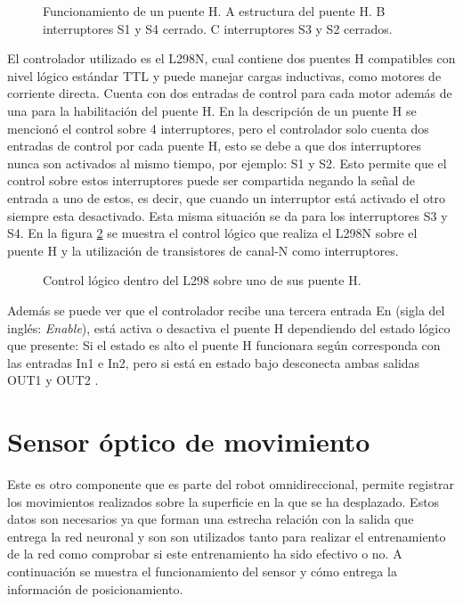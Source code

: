 \documentclass{iccmemoria}
\begin{document}
\begin{figure}[H]
  \centering
  
  \caption[Funcionamiento de un puente H.]{Funcionamiento de un puente H. A estructura del puente H. B interruptores S1 y S4 cerrado. C interruptores S3 y S2 cerrados.}
  \label{fig:H bridge}
\end{figure}

El controlador utilizado es el L298N, cual contiene dos puentes H compatibles con nivel lógico estándar TTL y puede manejar cargas inductivas, como motores de corriente directa. Cuenta con dos entradas de control para cada motor además de una para la habilitación del puente H. En la descripción de un puente H se mencionó el control sobre 4 interruptores, pero el controlador solo cuenta dos entradas de control por cada puente H, esto se debe a que dos interruptores nunca son activados al mismo tiempo, por ejemplo: S1 y S2. Esto permite que el control sobre estos interruptores puede ser compartida negando la señal de entrada a uno de estos, es decir, que cuando un interruptor está activado el otro siempre esta desactivado. Esta misma situación se da para los interruptores S3 y S4. En la figura \ref{fig:H bridge circuit} se muestra el control lógico que realiza el L298N sobre el puente H y la utilización de transistores de canal-N  como interruptores.\\

\begin{figure}[H]
  \centering
  \selectfont{
  
  }
  \caption[Control lógico del controlador L298]{Control lógico dentro del L298 sobre uno de sus puente H.}
  \label{fig:H bridge circuit}
\end{figure}

Además se puede ver que el controlador recibe una tercera entrada En (sigla del inglés: \emph{Enable}), está activa o desactiva el puente H dependiendo del estado lógico que presente: Si el estado es alto el puente H funcionara según corresponda con las entradas In1 e In2, pero si está en estado bajo desconecta ambas salidas OUT1 y OUT2 \cite{st:l298}.

\section{Sensor óptico de movimiento}

Este es otro componente que es parte del robot omnidireccional, permite registrar los movimientos realizados sobre la superficie en la que se ha desplazado. Estos datos son necesarios ya que forman una estrecha relación con la salida que entrega la red neuronal y son son utilizados tanto para realizar el entrenamiento de la red como comprobar si este entrenamiento ha sido efectivo o no. A continuación se muestra el funcionamiento del sensor y cómo entrega la información de posicionamiento.\\
\end{document}
